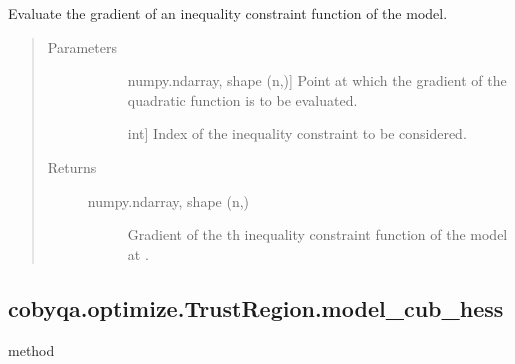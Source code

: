 \documentclass[letterpaper,10pt,english]{sphinxmanual}
\begin{document}
\begin{fulllineitems}
\begin{fulllineitems}
\label{\detokenize{refs/generated/cobyqa.optimize.TrustRegion.model_cub_grad:cobyqa.optimize.TrustRegion.model_cub_grad}}
\sphinxAtStartPar
Evaluate the gradient of an inequality constraint function of the model.
\begin{quote}\begin{description}
\item[{Parameters}] \leavevmode\begin{description}
\item[{}] \leavevmode{[}numpy.ndarray, shape (n,){]}
\sphinxAtStartPar
Point at which the gradient of the quadratic function is to be
evaluated.

\item[{}] \leavevmode{[}int{]}
\sphinxAtStartPar
Index of the inequality constraint to be considered.

\end{description}

\item[{Returns}] \leavevmode\begin{description}
\item[{numpy.ndarray, shape (n,)}] \leavevmode
\sphinxAtStartPar
Gradient of the \sphinxhyphen{}th inequality constraint function of the model
at .

\end{description}

\end{description}\end{quote}

\end{fulllineitems}



\subsection{cobyqa.optimize.TrustRegion.model\_cub\_hess}
\label{\detokenize{refs/generated/cobyqa.optimize.TrustRegion.model_cub_hess:cobyqa-optimize-trustregion-model-cub-hess}}\label{\detokenize{refs/generated/cobyqa.optimize.TrustRegion.model_cub_hess::doc}}
\sphinxAtStartPar
method


\end{fulllineitems}
\end{document}
